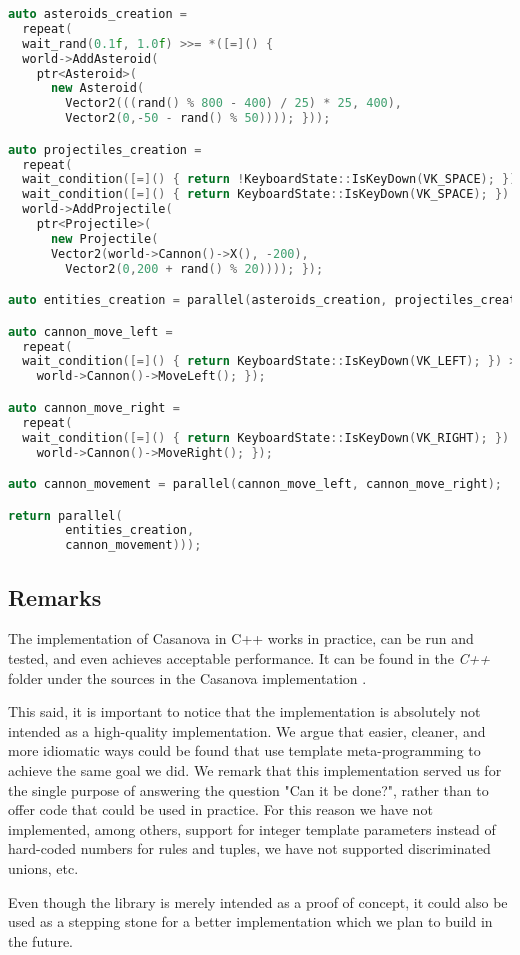 \begin{lstlisting}[language=C++]
auto asteroids_creation = 
  repeat(
  wait_rand(0.1f, 1.0f) >>= *([=]() { 
  world->AddAsteroid(
    ptr<Asteroid>(
      new Asteroid(
        Vector2(((rand() % 800 - 400) / 25) * 25, 400), 
        Vector2(0,-50 - rand() % 50)))); }));

auto projectiles_creation = 
  repeat(
  wait_condition([=]() { return !KeyboardState::IsKeyDown(VK_SPACE); }) >>=
  wait_condition([=]() { return KeyboardState::IsKeyDown(VK_SPACE); }) >>= *[=]() { 
  world->AddProjectile(
    ptr<Projectile>(
      new Projectile(
      Vector2(world->Cannon()->X(), -200), 
        Vector2(0,200 + rand() % 20)))); });

auto entities_creation = parallel(asteroids_creation, projectiles_creation);

auto cannon_move_left = 
  repeat(
  wait_condition([=]() { return KeyboardState::IsKeyDown(VK_LEFT); }) >>= *[=]() { 
    world->Cannon()->MoveLeft(); });

auto cannon_move_right = 
  repeat(
  wait_condition([=]() { return KeyboardState::IsKeyDown(VK_RIGHT); }) >>= *[=]() { 
    world->Cannon()->MoveRight(); });

auto cannon_movement = parallel(cannon_move_left, cannon_move_right);

return parallel(
        entities_creation, 
        cannon_movement)));
\end{lstlisting}


\subsection{Remarks}
The implementation of Casanova in C++ works in practice, can be run and tested, and even achieves acceptable performance. It can be found in the \textit{C++} folder under the sources in the Casanova implementation \cite{CASANOVA_CODEPLEX}. 

This said, it is important to notice that the implementation is absolutely not intended as a high-quality implementation. We argue that easier, cleaner, and more idiomatic ways could be found that use template meta-programming to achieve the same goal we did. We remark that this implementation served us for the single purpose of answering the question "Can it be done?", rather than to offer code that could be used in practice. For this reason we have not implemented, among others, support for integer template parameters instead of hard-coded numbers for rules and tuples, we have not supported discriminated unions, etc.

Even though the library is merely intended as a proof of concept, it could also be used as a stepping stone for a better implementation which we plan to build in the future.
